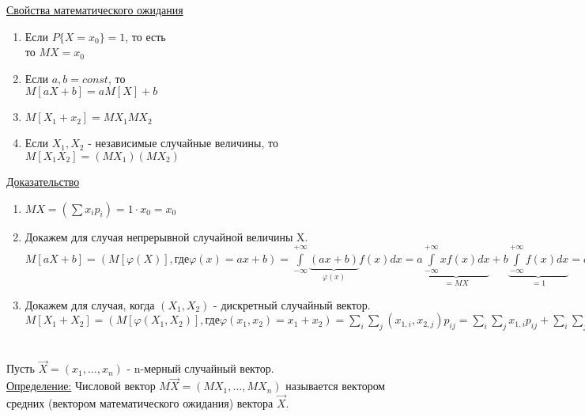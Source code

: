 \underline{Свойства математического ожидания}
\begin{enumerate}
	\item[$1^o$] Если $P\{X = x_0\} = 1$, то есть \\
	то $MX = x_0$
	
	\item[$2^o$] Если $a,b = const$, то \\
	$M[aX + b] = aM[X] + b$
	
	\item[$3^o$] $M[X_1 + x_2] = MX_1 MX_2$
	
	\item[$4^o$] Если $X_1, X_2$ - независимые случайные величины, то $M[X_1 X_2] = (MX_1)(MX_2)$
\end{enumerate}


\underline{Доказательство}
\begin{enumerate}
	\item[$1^o$] $MX = \left(\sum x_i p_i\right) = 1 \cdot x_0 = x_0$
	
	\item[$2^o$] Докажем для случая непрерывной случайной величины X. \\
	$\displaystyle  M[aX + b] = \left( M[\varphi(X)], \text{где} \varphi(x) = ax+b\right) =  \int\limits_{-\infty}^{+\infty} \underbrace{(ax+b)}_{\varphi(x)} f(x) dx = a \underbrace{\int\limits_{-\infty}^{+\infty}xf(x) dx}_{= MX} + b \underbrace{\int\limits_{-\infty}^{+\infty} f(x)dx}_{= 1} = aMX + b$
	
	\item[$3^o$] Докажем для случая, когда $(X_1, X_2)$ - дискретный случайный вектор. \\
	$M[X_1 + X_2] = \left( M[\varphi(X_1,X_2)], \text{где} \varphi(x_1, x_2) = x_1 + x_2\right) = \sum\limits_i \sum\limits_j \left(x_{1,i}, x_{2,j}\right) p_{ij} = \sum\limits_i \sum\limits_j x_{1,i} p_{ij} + \sum\limits_i \sum\limits_j x_{2,j} p_{ij} = \sum\limits_i x_{1,i} \underbrace{\sum\limits_j p_{ij}}_{P\{X_1 = x_{1,i}\}} + \sum\limits_j x_{2,j} \underbrace{\sum\limits_i p_{ij}}_{P\{X_2 = x_{2,j}\}} = \underbrace{\sum\limits_i P\{X_1 = x_{1,i}\} \cdot x_{1,i}}_{= MX_1} + \underbrace{\sum\limits_j P\{X_2 = x_{2,j}\} \cdot x_{2,j}}_{= MX_2} = MX_1 + MX_2$
\end{enumerate}


Пусть $\vec{X} = (x_1, \ldots, x_n)$ - n-мерный случайный вектор. \\
\underline{Определение:} Числовой вектор $M\vec{X} = (MX_1, \ldots, MX_n)$ называется вектором средних (вектором математического ожидания) вектора $\vec{X}$.






















